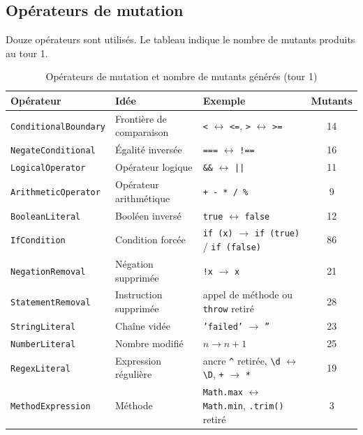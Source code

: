 \documentclass[12pt,a4paper]{article}
\begin{document}
\subsection{Opérateurs de mutation}
Douze opérateurs sont utilisés. Le tableau indique le nombre de mutants produits au tour 1.
\begin{table}[H]
\centering
\footnotesize
\begin{tabular}{p{3.2cm}p{3.4cm}p{6.3cm}c}
\toprule
\textbf{Opérateur} & \textbf{Idée} & \textbf{Exemple} & \textbf{Mutants} \\
\midrule
\texttt{ConditionalBoundary} & Frontière de comparaison & \texttt{<} $\leftrightarrow$ \texttt{<=}, \texttt{>} $\leftrightarrow$ \texttt{>=} & 14 \\
\texttt{NegateConditional} & Égalité inversée & \texttt{===} $\leftrightarrow$ \texttt{!==} & 16 \\
\texttt{LogicalOperator} & Opérateur logique & \texttt{\&\&} $\leftrightarrow$ \texttt{||} & 11 \\
\texttt{ArithmeticOperator} & Opérateur arithmétique & \texttt{+ - * / \%} & 9 \\
\texttt{BooleanLiteral} & Booléen inversé & \texttt{true} $\leftrightarrow$ \texttt{false} & 12 \\
\texttt{IfCondition} & Condition forcée & \texttt{if (x)} $\rightarrow$ \texttt{if (true)} / \texttt{if (false)} & 86 \\
\texttt{NegationRemoval} & Négation supprimée & \texttt{!x} $\rightarrow$ \texttt{x} & 21 \\
\texttt{StatementRemoval} & Instruction supprimée & appel de méthode ou \texttt{throw} retiré & 28 \\
\texttt{StringLiteral} & Chaîne vidée & \texttt{'failed'} $\rightarrow$ \texttt{''} & 23 \\
\texttt{NumberLiteral} & Nombre modifié & $n \rightarrow n+1$ & 25 \\
\texttt{RegexLiteral} & Expression régulière & ancre \texttt{\^{}} retirée, \texttt{\textbackslash d} $\leftrightarrow$ \texttt{\textbackslash D}, \texttt{+} $\rightarrow$ \texttt{*} & 19 \\
\texttt{MethodExpression} & Méthode & \texttt{Math.max} $\leftrightarrow$ \texttt{Math.min}, \texttt{.trim()} retiré & 3 \\

\bottomrule
\end{tabular}
\caption{Opérateurs de mutation et nombre de mutants générés (tour 1)}
\end{table}
\end{document}
